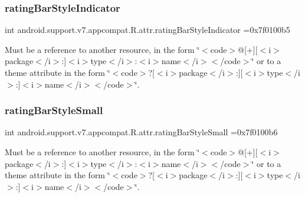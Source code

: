 \subsubsection{\texorpdfstring{rating\+Bar\+Style\+Indicator}{ratingBarStyleIndicator}}
{\footnotesize\ttfamily int android.\+support.\+v7.\+appcompat.\+R.\+attr.\+rating\+Bar\+Style\+Indicator =0x7f0100b5\hspace{0.3cm}{\ttfamily [static]}}

Must be a reference to another resource, in the form \char`\"{}$<$code$>$@\mbox{[}+\mbox{]}\mbox{[}$<$i$>$package$<$/i$>$\+:\mbox{]}$<$i$>$type$<$/i$>$\+:$<$i$>$name$<$/i$>$$<$/code$>$\char`\"{} or to a theme attribute in the form \char`\"{}$<$code$>$?\mbox{[}$<$i$>$package$<$/i$>$\+:\mbox{]}\mbox{[}$<$i$>$type$<$/i$>$\+:\mbox{]}$<$i$>$name$<$/i$>$$<$/code$>$\char`\"{}. \mbox{\label{classandroid_1_1support_1_1v7_1_1appcompat_1_1R_1_1attr_a449778fbfb018f0be16f0bb702ae6c0e}} 
\subsubsection{\texorpdfstring{rating\+Bar\+Style\+Small}{ratingBarStyleSmall}}
{\footnotesize\ttfamily int android.\+support.\+v7.\+appcompat.\+R.\+attr.\+rating\+Bar\+Style\+Small =0x7f0100b6\hspace{0.3cm}{\ttfamily [static]}}

Must be a reference to another resource, in the form \char`\"{}$<$code$>$@\mbox{[}+\mbox{]}\mbox{[}$<$i$>$package$<$/i$>$\+:\mbox{]}$<$i$>$type$<$/i$>$\+:$<$i$>$name$<$/i$>$$<$/code$>$\char`\"{} or to a theme attribute in the form \char`\"{}$<$code$>$?\mbox{[}$<$i$>$package$<$/i$>$\+:\mbox{]}\mbox{[}$<$i$>$type$<$/i$>$\+:\mbox{]}$<$i$>$name$<$/i$>$$<$/code$>$\char`\"{}. \mbox{\label{classandroid_1_1support_1_1v7_1_1appcompat_1_1R_1_1attr_acd83a3fdb876fe9d37c12f157cf90972}} 
